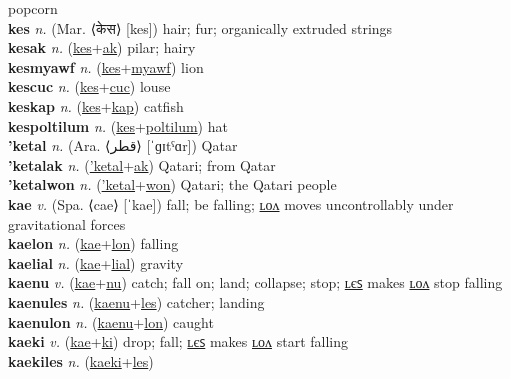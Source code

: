 popcorn \label{kehemais} \\
\textbf{kes} \textit{n.} (Mar. ⟨केस⟩ [kes])
hair; fur; organically extruded strings \label{kes} \\
\textbf{kesak} \textit{n.} (\hyperref[kes]{kes}+\hyperref[ak]{ak})
pilar; hairy \label{kesak} \\
\textbf{kesmyawf} \textit{n.} (\hyperref[kes]{kes}+\hyperref[myawf]{myawf})
lion \label{kesmyawf} \\
\textbf{kescuc} \textit{n.} (\hyperref[kes]{kes}+\hyperref[cuc]{cuc})
louse \label{kescuc} \\
\textbf{keskap} \textit{n.} (\hyperref[kes]{kes}+\hyperref[kap]{kap})
catfish \label{keskap} \\
\textbf{kespoltilum} \textit{n.} (\hyperref[kes]{kes}+\hyperref[poltilum]{poltilum})
hat \label{kespoltilum} \\
\textbf{'ketal} \textit{n.} (Ara. ⟨قطر‎⟩ [ˈɡɪtˤɑr])
Qatar \label{'ketal} \\
\textbf{'ketalak} \textit{n.} (\hyperref['ketal]{'ketal}+\hyperref[ak]{ak})
Qatari; from Qatar \label{'ketalak} \\
\textbf{'ketalwon} \textit{n.} (\hyperref['ketal]{'ketal}+\hyperref[won]{won})
Qatari; the Qatari people \label{'ketalwon} \\
\textbf{kae} \textit{v.} (Spa. ⟨cae⟩ [ˈkae])
fall; be falling; \hyperref[kaelon]{ʟᴏᴧ} moves uncontrollably under gravitational forces \label{kae} \\
\textbf{kaelon} \textit{n.} (\hyperref[kae]{kae}+\hyperref[lon]{lon})
falling \label{kaelon} \\
\textbf{kaelial} \textit{n.} (\hyperref[kae]{kae}+\hyperref[lial]{lial})
gravity \label{kaelial} \\
\textbf{kaenu} \textit{v.} (\hyperref[kae]{kae}+\hyperref[nu]{nu})
catch; fall on; land; collapse; stop; \hyperref[kaenules]{ʟєꜱ} makes \hyperref[kaenulon]{ʟᴏᴧ} stop falling \label{kaenu} \\
\textbf{kaenules} \textit{n.} (\hyperref[kaenu]{kaenu}+\hyperref[les]{les})
catcher; landing \label{kaenules} \\
\textbf{kaenulon} \textit{n.} (\hyperref[kaenu]{kaenu}+\hyperref[lon]{lon})
caught \label{kaenulon} \\
\textbf{kaeki} \textit{v.} (\hyperref[kae]{kae}+\hyperref[ki]{ki})
drop; fall; \hyperref[kaekiles]{ʟєꜱ} makes \hyperref[kaekilon]{ʟᴏᴧ} start falling \label{kaeki} \\
\textbf{kaekiles} \textit{n.} (\hyperref[kaeki]{kaeki}+\hyperref[les]{les})
